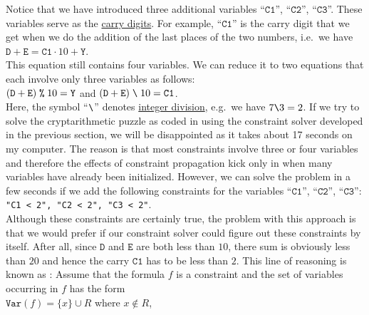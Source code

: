 Notice that we have introduced three additional variables ``$\texttt{C1}$'', ``$\texttt{C2}$'', ``$\texttt{C3}$''. 
These variables serve as the \href{https://en.wikipedia.org/wiki/Carry_(arithmetic)}{carry digits}.  For
example, ``$\texttt{C1}$'' is the carry digit that we get when we do the addition of the last places of the two
numbers, i.e.~we have
\\[0.2cm]
\hspace*{1.3cm}
$\texttt{D} + \texttt{E} = \texttt{C1} \cdot 10 + \texttt{Y}$.
\\[0.2cm]
This equation still contains four variables.  We can reduce it to two equations that each involve only three
variables as follows:
\\[0.2cm]
\hspace*{1.3cm}
$(\texttt{D} + \texttt{E})\; \texttt{\symbol{37}}\; 10 = \texttt{Y}$ \quad and \quad
$(\texttt{D} + \texttt{E}) \;\texttt{\symbol{92}}\; 10 = \texttt{C1}$.
\\[0.2cm]
Here, the symbol ``$\texttt{\symbol{92}}$'' denotes 
\href{https://en.wikipedia.org/wiki/Division_(mathematics)#Of_integers}{integer division}, e.g.~we have $7 \texttt{\symbol{92}} 3 = 2$.
If we try to solve the cryptarithmetic puzzle as coded in  using the
constraint solver developed in the previous section, we will be disappointed as it takes about 17 seconds on my
computer.  The reason is that most constraints involve three or four variables and therefore the effects of
constraint propagation kick only in when many variables have already been initialized.  However, we can solve
the problem in a few seconds if we add the following constraints for the 
variables ``$\texttt{C1}$'', ``$\texttt{C2}$'', ``$\texttt{C3}$'':
\\[0.2cm]
\hspace*{1.3cm}
\texttt{"C1 < 2", "C2 < 2", "C3 < 2"}.
\\[0.2cm]
Although these constraints are certainly true, the problem with this approach is that we would prefer if our
constraint solver could figure out these constraints by itself.  After all, since $\texttt{D}$ and
$\texttt{E}$ are both less than $10$, there sum is obviously less than $20$ and hence the carry $\texttt{C1}$
has to be less than $2$.  This line of reasoning is known as :
Assume that the formula $f$ is a constraint and the set of variables occurring in $f$ has the form
\\[0.2cm]
\hspace*{1.3cm}
$\texttt{Var}(f) = \{ x \} \cup R$ \quad where $x \not\in R$,
